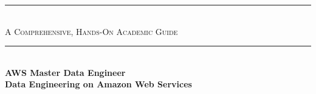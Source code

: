 \begin{titlepage}
\centering

{\color{primary}\rule{\textwidth}{2.5pt}}\\[0.35cm]
{\Large\scshape\color{primarydark} A Comprehensive, Hands-On Academic Guide}\\[0.30cm]
{\color{primary}\rule{\textwidth}{2.5pt}}\\[1.15cm]

{\fontsize{36}{42}\selectfont\bfseries\color{primarydark}%
 AWS Master Data Engineer}\\[0.55cm]
{\fontsize{20}{25}\selectfont\bfseries\color{accent}%
 Data Engineering on Amazon Web Services}\\[1.05cm]


\end{titlepage}
